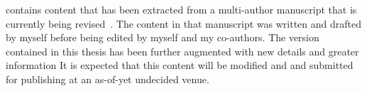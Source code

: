 \documentclass[\main/thesis.tex]{subfiles}
\begin{document}
\begin{preface}

 contains content that has been extracted from a multi-author manuscript that is currently being revised~\autocite{kuzma2021fast}.
The content in that manuscript was written and drafted by myself before being edited by myself and my co-authors.
The version contained in this thesis has been further augmented with new details and greater information
It is expected that this content will be modified and and submitted for publishing at an as-of-yet undecided venue.


%
%
\end{preface}
\end{document}
